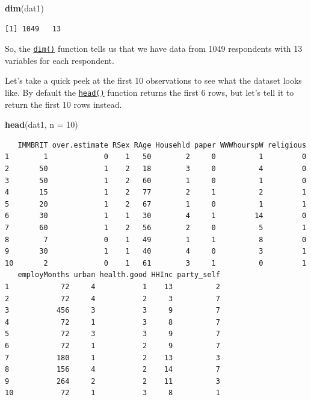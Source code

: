 \documentclass[]{article}
\newenvironment{Shaded}{\begin{snugshade}}{\end{snugshade}}
\newcommand{\DataTypeTok}[1]{\textcolor[rgb]{0.13,0.29,0.53}{#1}}
\newcommand{\DecValTok}[1]{\textcolor[rgb]{0.00,0.00,0.81}{#1}}
\newcommand{\KeywordTok}[1]{\textcolor[rgb]{0.13,0.29,0.53}{\textbf{#1}}}
\newcommand{\NormalTok}[1]{#1}
\begin{document}
\begin{Shaded}
\begin{Highlighting}[]
\KeywordTok{dim}\NormalTok{(dat1)}
\end{Highlighting}
\end{Shaded}

\begin{verbatim}
[1] 1049   13
\end{verbatim}

So, the \href{http://bit.ly/R_dim}{\texttt{dim()}} function tells us that we have data from 1049 respondents with 13 variables for each respondent.

Let's take a quick peek at the first 10 observations to see what the dataset looks like. By default the \href{http://bit.ly/R_head}{\texttt{head()}} function returns the first 6 rows, but let's tell it to return the first 10 rows instead.

\begin{Shaded}
\begin{Highlighting}[]
\KeywordTok{head}\NormalTok{(dat1, }\DataTypeTok{n =} \DecValTok{10}\NormalTok{)}
\end{Highlighting}
\end{Shaded}

\begin{verbatim}
   IMMBRIT over.estimate RSex RAge Househld paper WWWhourspW religious
1        1             0    1   50        2     0          1         0
2       50             1    2   18        3     0          4         0
3       50             1    2   60        1     0          1         0
4       15             1    2   77        2     1          2         1
5       20             1    2   67        1     0          1         1
6       30             1    1   30        4     1         14         0
7       60             1    2   56        2     0          5         1
8        7             0    1   49        1     1          8         0
9       30             1    1   40        4     0          3         1
10       2             0    1   61        3     1          0         1
   employMonths urban health.good HHInc party_self
1            72     4           1    13          2
2            72     4           2     3          7
3           456     3           3     9          7
4            72     1           3     8          7
5            72     3           3     9          7
6            72     1           2     9          7
7           180     1           2    13          3
8           156     4           2    14          7
9           264     2           2    11          3
10           72     1           3     8          1
\end{verbatim}
\end{document}
